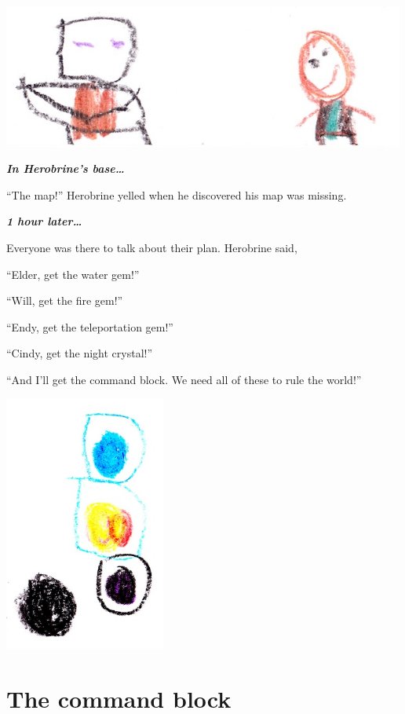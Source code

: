 \documentclass[12pt,twoside]{krantz}
\begin{document}
\includegraphics[width=5.20833in,height=\textheight]{img/final-war/malek-beckett.jpg}

\textbf{\emph{In Herobrine's base\ldots{}}}

``The map!'' Herobrine yelled when he discovered his map was missing.

\textbf{\emph{1 hour later\ldots{}}}

Everyone was there to talk about their plan. Herobrine said,

``Elder, get the water gem!''

``Will, get the fire gem!''

``Endy, get the teleportation gem!''

``Cindy, get the night crystal!''

``And I'll get the command block. We need all of these to rule the
world!''

\includegraphics[width=2.08333in,height=\textheight]{img/final-war/crystals.jpg}

\hypertarget{the-command-block}{%
\section{The command block}\label{the-command-block}}
\end{document}
